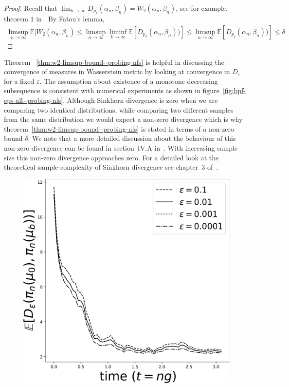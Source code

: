 {\begin{thm}
\begin{proof}
Recall that $\lim_{k\to\infty}D_{p_k} (\alpha_n, \beta_n) = W_2 (\alpha_n, \beta_n)$, see for example, theorem $1$ in \cite{genevay2018learning}. By Fatou's lemma,
\begin{align}
    \limsup_{n\to\infty}\mathbb E[W_2 (\alpha_n, \beta_n) \le \limsup_{n\to\infty}\liminf_{k\to\infty}\mathbb E[D_{p_k}(\alpha_n, \beta_n))] \le  \limsup_{n\to\infty}\mathbb E[D_{p_j}(\alpha_n, \beta_n))]\le\delta
\end{align}
\end{proof}
\label{thm:w2-limsup-bound--probing-nfs}
\end{thm}
Theorem ~\ref{thm:w2-limsup-bound--probing-nfs} is helpful in discussing the convergence of measures in Wasserstein metric by looking at convergence in $D_\varepsilon$ for a fixed $\varepsilon$. The assumption about existence of a monotone decreasing subsequence is consistent with numerical experiments as shown in figure~\ref{fig:bpf-eps-all--probing-nfs}. Although Sinkhorn divergence is zero when we are comparing two identical distributions, while comparing two different samples from the same distribution we would expect a non-zero divergence which is why theorem~\ref{thm:w2-limsup-bound--probing-nfs}  is stated in terms of a non-zero bound $\delta$. We note that a more detailed discussion about the behaviour of this non-zero divergence can be found in section~IV.A in~\cite{mandal2021stability}. With increasing sample size this non-zero divergence approaches zero. For a detailed look at the theoretical sample-complexity of Sinkhorn divergence see chapter~$3$ of~\cite{genevay2019entropy}.
\begin{figure}
    \centering
    \includegraphics[scale=0.5]{probing-nfs/plots/plots-bpf-eps_all.png}

\end{figure}}
